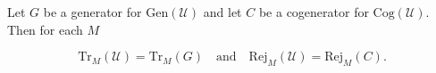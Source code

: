 Let $G$ be a generator for $\mathrm{Gen}(\mathcal{U})$ and let $C$ be a cogenerator for $\mathrm{Cog}(\mathcal{U})$. Then for each $M$

$$\mathrm{Tr}_M(\mathcal{U}) = \mathrm{Tr}_M(G) \quad \text{and} \quad \mathrm{Rej}_M(\mathcal{U}) = \mathrm{Rej}_M(C).$$
